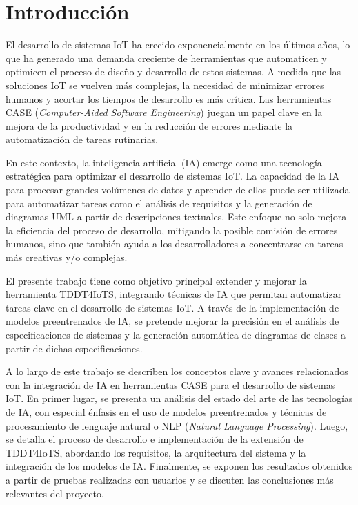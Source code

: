 \label{chapter:introduccion}\chapter{Introducción}

El desarrollo de sistemas IoT ha crecido exponencialmente en los últimos años, lo que ha generado una demanda creciente de herramientas que automaticen y optimicen el proceso de diseño y desarrollo de estos sistemas. A medida que las soluciones IoT se vuelven más complejas, la necesidad de minimizar errores humanos y acortar los tiempos de desarrollo es más crítica. Las herramientas CASE (\textit{Computer-Aided Software Engineering})  juegan un papel clave en la mejora de la productividad y en la reducción de errores mediante la automatización de tareas rutinarias.

En este contexto, la inteligencia artificial (IA) emerge como una tecnología estratégica para optimizar el desarrollo de sistemas IoT. La capacidad de la IA para procesar grandes volúmenes de datos y aprender de ellos puede ser utilizada para automatizar tareas como el análisis de requisitos y la generación de diagramas UML a partir de descripciones textuales. Este enfoque no solo mejora la eficiencia del proceso de desarrollo, mitigando la posible comisión de errores humanos, sino que también ayuda a los desarrolladores a concentrarse en tareas más creativas y/o complejas.

El presente trabajo tiene como objetivo principal extender y mejorar la herramienta  TDDT4IoTS, integrando técnicas de IA que permitan automatizar tareas clave en el desarrollo de sistemas IoT. A través de la implementación de modelos preentrenados de IA, se pretende mejorar la precisión en el análisis de especificaciones de sistemas y la generación automática de diagramas de clases a partir de dichas especificaciones.

A lo largo de este trabajo se describen los conceptos clave y avances relacionados con la integración de IA en herramientas CASE para el desarrollo de sistemas IoT. En primer lugar, se presenta un análisis del estado del arte de las tecnologías de IA, con especial énfasis en el uso de modelos preentrenados y técnicas de procesamiento de lenguaje natural o NLP (\textit{Natural Language Processing}). Luego, se detalla el proceso de desarrollo e implementación de la extensión de TDDT4IoTS, abordando los requisitos, la arquitectura del sistema y la integración de los modelos de IA. Finalmente, se exponen los resultados obtenidos a partir de pruebas realizadas con usuarios y se discuten las conclusiones más relevantes del proyecto.










